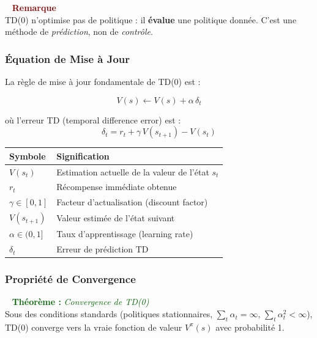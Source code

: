 \documentclass[11pt,a4paper]{article}
\newenvironment{thmbox}[1]{%
  \vspace{3pt}\begin{framed}
  \noindent{\color{DarkGreen}\rule{0.3cm}{3pt}}~%
  \textcolor{DarkGreen}{\textbf{Théorème :} \textit{#1}}\\[3pt]}
  {\end{framed}\vspace{3pt}}
\newenvironment{warnbox}{%
  \vspace{3pt}\begin{framed}
  \noindent{\color{DarkRed}\rule{0.3cm}{3pt}}~%
  \textcolor{DarkRed}{\textbf{Remarque}}\\[3pt]}
  {\end{framed}\vspace{3pt}}
\begin{document}
\begin{warnbox}
TD(0) n'optimise pas de politique : il \textbf{évalue} une politique donnée. C'est une méthode de \emph{prédiction}, non de \emph{contrôle}.
\end{warnbox}

\subsubsection{Équation de Mise à Jour}

La règle de mise à jour fondamentale de TD(0) est :

\begin{tcolorbox}[colback=LightBlue,colframe=NavyBlue,arc=4pt]
\begin{equation}
  \boxed{V(s) \leftarrow V(s) + \alpha \,\delta_t}
\end{equation}
\end{tcolorbox}

où l'erreur TD (temporal difference error) est :
\begin{equation}
  \delta_t = r_t + \gamma \, V(s_{t+1}) - V(s_t)
\end{equation}

\begin{center}
\begin{tabular}{p{3cm} p{8cm}}
\toprule
\rowcolor{LightBlue}
\textbf{Symbole} & \textbf{Signification} \\
\midrule
$V(s_t)$ & Estimation actuelle de la valeur de l'état $s_t$ \\
$r_t$ & Récompense immédiate obtenue \\
$\gamma \in [0,1]$ & Facteur d'actualisation (discount factor) \\
$V(s_{t+1})$ & Valeur estimée de l'état suivant \\
$\alpha \in (0,1]$ & Taux d'apprentissage (learning rate) \\
$\delta_t$ & Erreur de prédiction TD \\
\bottomrule
\end{tabular}
\end{center}

\subsubsection{Propriété de Convergence}

\begin{thmbox}{Convergence de TD(0)}
Sous des conditions standards (politiques stationnaires, $\sum_t \alpha_t = \infty$, $\sum_t \alpha_t^2 < \infty$), TD(0) converge vers la vraie fonction de valeur $V^\pi(s)$ avec probabilité 1.
\end{thmbox}
\end{document}
